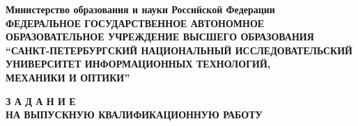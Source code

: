 
\thispagestyle{empty}

\begin{center}
  {
    \bfseries
    {
      \subnormal
      Министерство образования и науки Российской Федерации
    } \\[-0.5em]
    {
      \scriptsize
      ФЕДЕРАЛЬНОЕ ГОСУДАРСТВЕННОЕ АВТОНОМНОЕ ОБРАЗОВАТЕЛЬНОЕ УЧРЕЖДЕНИЕ ВЫСШЕГО ОБРАЗОВАНИЯ
    } \\[-0.25em]
    {
      \subnormal
      “САНКТ-ПЕТЕРБУРГСКИЙ НАЦИОНАЛЬНЫЙ ИССЛЕДОВАТЕЛЬСКИЙ \\[-0.5em]
      УНИВЕРСИТЕТ ИНФОРМАЦИОННЫХ ТЕХНОЛОГИЙ, \\[-0.75em]
      МЕХАНИКИ И ОПТИКИ” \\[2em]
    }
  }
\end{center}

\small


\begin{center}
  {
    \bfseries
    {
      \normalsize
      З А Д А Н И Е \\
    }
    НА  ВЫПУСКНУЮ  КВАЛИФИКАЦИОННУЮ  РАБОТУ \\[1.5em]
  }
\end{center}

